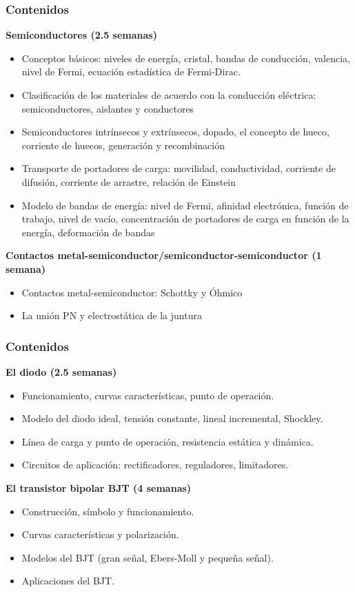 \documentclass[10pt,t,aspectratio=169]{beamer}
\begin{document}
\begin{frame}[t]
\frametitle{Contenidos}

\textbf{Semiconductores (2.5 semanas)}

\begin{itemize}
	\item Conceptos básicos: niveles de energía, cristal, bandas de conducción, valencia, nivel de Fermi, ecuación estadística de Fermi-Dirac.
	\item Clasificación de los materiales de acuerdo con la conducción eléctrica: semiconductores, aislantes y conductores
	\item Semiconductores intrínsecos y extrínsecos, dopado, el concepto de hueco, corriente de huecos, generación y recombinación
	\item Transporte de portadores de carga: movilidad, conductividad, corriente de difusión, corriente de arrastre, relación de Einstein
	\item Modelo de bandas de energía: nivel de Fermi, afinidad electrónica, función de trabajo, nivel de vacío, concentración de portadores de carga en función de la energía, deformación de bandas
\end{itemize}

\vspace{3mm}
\textbf{Contactos metal-semiconductor/semiconductor-semiconductor (1 semana)}

\begin{itemize}
	\item Contactos metal-semiconductor: Schottky y Óhmico
	\item La unión PN y electrostática de la juntura
\end{itemize}

\end{frame}

\begin{frame}[t]
\frametitle{Contenidos}

\textbf{El diodo (2.5 semanas)}
	\begin{itemize}
	\item Funcionamiento, curvas características, punto de operación. 
	\item Modelo del diodo ideal, tensión constante, lineal incremental, Shockley.
	\item Línea de carga y punto de operación, resistencia estática y dinámica.
	\item Circuitos de aplicación: rectificadores, reguladores, limitadores. 
	
\end{itemize}

\vspace{3mm}
\textbf{El transistor bipolar BJT (4 semanas)}

\begin{itemize}
	\item Construcción, símbolo y funcionamiento.
	\item Curvas características y polarización.
	\item Modelos del BJT (gran señal, Ebers-Moll y pequeña señal).
	\item Aplicaciones del BJT.
\end{itemize}
\end{frame}
\end{document}
